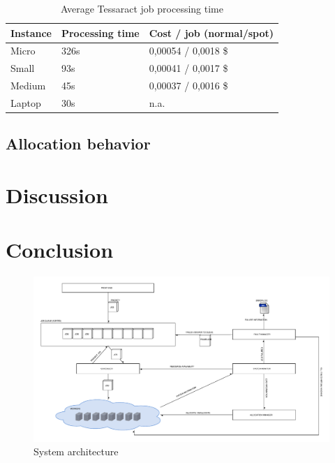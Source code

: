 \documentclass[a4paper]{IEEEtran}
\begin{document}
\begin{table}
\caption{Average Tessaract job processing time}
\label{tesperfresults}
\centering
\begin{tabular}{| l | l | l |}
\hline
Instance & Processing time & Cost / job (normal/spot) \\ \hline
Micro & 326s & 0,00054 / 0,0018 \$ \\ \hline
Small & 93s & 0,00041 / 0,0017 \$ \\ \hline
Medium & 45s & 0,00037 / 0,0016 \$ \\ \hline
Laptop & 30s & n.a. \\ \hline
\end{tabular}
\end{table}

\subsection{Allocation behavior}

\section{Discussion}

\section{Conclusion}

\begin{thebibliography}{9}

 
\end{thebibliography}


\newpage

\begin{landscape}
\appendix

\begin{figure}[h]
\centering
\includegraphics[width=700pt]{"System Architecture 2"}
\caption{System architecture}
\label{fig_sysarch}
\end{figure}
\end{landscape}
\clearpage
\end{document}
